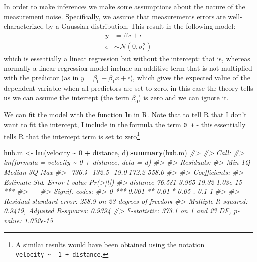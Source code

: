 \documentclass[
]{book}
\newenvironment{Shaded}{\begin{snugshade}}{\end{snugshade}}
\newcommand{\CommentTok}[1]{\textcolor[rgb]{0.56,0.35,0.01}{\textit{#1}}}
\newcommand{\DecValTok}[1]{\textcolor[rgb]{0.00,0.00,0.81}{#1}}
\newcommand{\FunctionTok}[1]{\textcolor[rgb]{0.13,0.29,0.53}{\textbf{#1}}}
\newcommand{\NormalTok}[1]{#1}
\newcommand{\OtherTok}[1]{\textcolor[rgb]{0.56,0.35,0.01}{#1}}
\newcommand{\SpecialCharTok}[1]{\textcolor[rgb]{0.81,0.36,0.00}{\textbf{#1}}}
\begin{document}
In order to make inferences we make some assumptions about the nature of the measurement noise. Specifically, we assume that measurements errors are well-characterized by a Gaussian distribution. This result in the following model:
\begin{align*}
y &= \beta x + \epsilon \\
\epsilon &\sim \mathcal{N} \left(0, \sigma_{\epsilon}^2 \right)
\end{align*}
which is essentially a linear regression but without the intercept: that is, whereas normally a linear regression model include an additive term that is not multiplied with the predictor (as in \(y = \beta_0 + \beta_1 x + \epsilon\)), which gives the expected value of the dependent variable when all predictors are set to zero, in this case the theory tells us we can assume the intercept (the term \(\beta_0\)) is zero and we can ignore it.

We can fit the model with the function \texttt{lm} in R. Note that to tell R that I don't want to fit the intercept, I include in the formula the term \texttt{0\ +} - this essentially tells R that the intercept term is set to zero\footnote{A similar results would have been obtained using the notation \texttt{velocity\ \textasciitilde{}\ -1\ +\ distance}.}

\begin{Shaded}
\begin{Highlighting}[]
\NormalTok{hub.m }\OtherTok{\textless{}{-}} \FunctionTok{lm}\NormalTok{(velocity }\SpecialCharTok{\textasciitilde{}} \DecValTok{0} \SpecialCharTok{+}\NormalTok{ distance, d)}
\FunctionTok{summary}\NormalTok{(hub.m)}
\CommentTok{\#\textgreater{} }
\CommentTok{\#\textgreater{} Call:}
\CommentTok{\#\textgreater{} lm(formula = velocity \textasciitilde{} 0 + distance, data = d)}
\CommentTok{\#\textgreater{} }
\CommentTok{\#\textgreater{} Residuals:}
\CommentTok{\#\textgreater{}    Min     1Q Median     3Q    Max }
\CommentTok{\#\textgreater{} {-}736.5 {-}132.5  {-}19.0  172.2  558.0 }
\CommentTok{\#\textgreater{} }
\CommentTok{\#\textgreater{} Coefficients:}
\CommentTok{\#\textgreater{}          Estimate Std. Error t value Pr(\textgreater{}|t|)    }
\CommentTok{\#\textgreater{} distance   76.581      3.965   19.32 1.03e{-}15 ***}
\CommentTok{\#\textgreater{} {-}{-}{-}}
\CommentTok{\#\textgreater{} Signif. codes:  }
\CommentTok{\#\textgreater{} 0 \textquotesingle{}***\textquotesingle{} 0.001 \textquotesingle{}**\textquotesingle{} 0.01 \textquotesingle{}*\textquotesingle{} 0.05 \textquotesingle{}.\textquotesingle{} 0.1 \textquotesingle{} \textquotesingle{} 1}
\CommentTok{\#\textgreater{} }
\CommentTok{\#\textgreater{} Residual standard error: 258.9 on 23 degrees of freedom}
\CommentTok{\#\textgreater{} Multiple R{-}squared:  0.9419, Adjusted R{-}squared:  0.9394 }
\CommentTok{\#\textgreater{} F{-}statistic: 373.1 on 1 and 23 DF,  p{-}value: 1.032e{-}15}
\end{Highlighting}
\end{Shaded}
\end{document}
